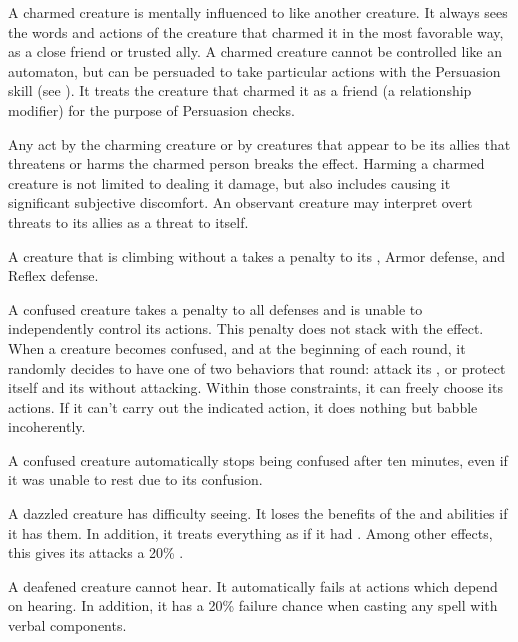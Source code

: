    A charmed creature is mentally influenced to like another creature.
  It always sees the words and actions of the creature that charmed it in the most favorable way, as a close friend or trusted ally.
  A charmed creature cannot be controlled like an automaton, but can be persuaded to take particular actions with the Persuasion skill (see ).
  It treats the creature that charmed it as a friend (a  relationship modifier) for the purpose of Persuasion checks.

  Any act by the charming creature or by creatures that appear to be its allies that threatens or harms the charmed person breaks the effect.
  Harming a charmed creature is not limited to dealing it damage, but also includes causing it significant subjective discomfort.
  An observant creature may interpret overt threats to its allies as a threat to itself.

   A creature that is climbing without a  takes a  penalty to its , Armor defense, and Reflex defense.

   A confused creature takes a  penalty to all defenses and is unable to independently control its actions.
  This penalty does not stack with the \stunned effect.
  When a creature becomes confused, and at the beginning of each round, it randomly decides to have one of two behaviors that round: attack its , or protect itself and its  without attacking.
  Within those constraints, it can freely choose its actions.
  If it can't carry out the indicated action, it does nothing but babble incoherently.

  A confused creature automatically stops being confused after ten minutes, even if it was unable to rest due to its confusion.

   A dazzled creature has difficulty seeing.
  It loses the benefits of the  and  abilities if it has them.
  In addition, it treats everything as if it had .
  Among other effects, this gives its  attacks a 20\% .

   A deafened creature cannot hear. It automatically fails at actions which depend on hearing. In addition, it has a 20\% failure chance when casting any spell with verbal components.

